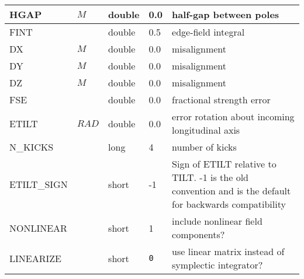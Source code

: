 \begin{tabular}{|l|l|l|l|p{\descwidth}|}
HGAP & $M$ & double &  0.0 & half-gap between poles  \\ \hline 
FINT &  & double &   0.5 & edge-field integral  \\ \hline 
DX & $M$ & double &  0.0 & misalignment  \\ \hline 
DY & $M$ & double &  0.0 & misalignment  \\ \hline 
DZ & $M$ & double &  0.0 & misalignment  \\ \hline 
FSE &  & double &  0.0 & fractional strength error  \\ \hline 
ETILT & $RAD$ & double &  0.0 & error rotation about incoming longitudinal axis  \\ \hline 
N\_KICKS &  & long &   4               & number of kicks  \\ \hline 
ETILT\_SIGN &  & short &   -1              & Sign of ETILT relative to TILT. -1 is the old convention and is the default for backwards compatibility  \\ \hline 
NONLINEAR &  & short &   1               & include nonlinear field components?  \\ \hline 
LINEARIZE &  & short &  \verb|0| & use linear matrix instead of symplectic integrator?  \\ \hline 
\end{tabular}

